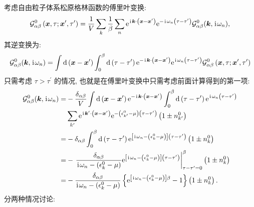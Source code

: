 考虑自由粒子体系松原格林函数的傅里叶变换:
\begin{equation}
\mathcal{G}_{\alpha \beta}^0\left(\boldsymbol{x}, \tau ; \boldsymbol{x}^{\prime}, \tau^{\prime}\right)=\frac{1}{V} \sum_k  \frac{1}{\beta} \sum_n\mathrm{e}^{\hspace{0.1em}\mathrm{i}\hspace{0.1em} \boldsymbol{k} \cdot\left(\boldsymbol{x}-\boldsymbol{x}^{\prime}\right)} \mathrm{e}^{-\hspace{0.1em}\mathrm{i}\hspace{0.1em} \omega_n\left(\tau-\tau^{\prime}\right)} \mathcal{G}_{\alpha \beta}^0(\boldsymbol{k}, \hspace{0.1em}\mathrm{i}\hspace{0.1em} \omega_n),
\end{equation}
其逆变换为:
\begin{equation}
\mathcal{G}_{\alpha \beta}^0(\boldsymbol{k}, \hspace{0.1em}\mathrm{i}\hspace{0.1em} \omega_n)=\int \mathrm{d}\left(\boldsymbol{x}-\boldsymbol{x}^{\prime}\right)\int_0^\beta \mathrm{d}\left(\tau-\tau^{\prime}\right) \mathrm{e}^{-\hspace{0.1em}\mathrm{i}\hspace{0.1em} \boldsymbol{k} \cdot\left(\boldsymbol{x}-\boldsymbol{x}^{\prime}\right)}  \mathrm{e}^{\hspace{0.1em}\mathrm{i}\hspace{0.1em} \omega_n\left(\tau-\tau^{\prime}\right)} \mathcal{G}_{\alpha \beta}^0\left(\boldsymbol{x}, \tau ; \boldsymbol{x}^{\prime}, \tau^{\prime}\right)
\end{equation}
只需考虑 $\tau>\tau^{\prime}$ 的情况, 也就是在傅里叶变换中只需考虑前面计算得到的第一项:
\begin{align}
\mathcal{G}_{\alpha \beta}^0(\boldsymbol{k}, \hspace{0.1em}\mathrm{i}\hspace{0.1em} \omega_n) =&-\frac{\delta_{\alpha \beta}}{V} \int \mathrm{d}\left(\boldsymbol{x}-\boldsymbol{x}^{\prime}\right) \mathrm{e}^{-\hspace{0.1em}\mathrm{i}\hspace{0.1em} \boldsymbol{k} \cdot\left(\boldsymbol{x}-\boldsymbol{x}^{\prime}\right)} \int_0^\beta \mathrm{d}\left(\tau-\tau^{\prime}\right) \mathrm{e}^{\hspace{0.1em}\mathrm{i}\hspace{0.1em} \omega_n\left(\tau-\tau^{\prime}\right)} \nonumber\\
&\sum_{k^{\prime}} \mathrm{e}^{\hspace{0.1em}\mathrm{i}\hspace{0.1em} \boldsymbol{k}^{\prime} \cdot\left(\boldsymbol{x}-\boldsymbol{x}^{\prime}\right)} \mathrm{e}^{-\left(\epsilon_{k^{\prime}}^0-\mu\right)\left(\tau-\tau^{\prime}\right)}\left(1 \pm n_{k^{\prime}}^0\right) \nonumber\\
=&-\delta_{\alpha \beta} \int_0^\beta  \mathrm{d}\left(\tau-\tau^{\prime}\right)\mathrm{e}^{\left[\hspace{0.1em}\mathrm{i}\hspace{0.1em} \omega_n-\left(\epsilon_k^0-\mu\right)\right]\left(\tau-\tau^{\prime}\right)}\left(1 \pm n_k^0\right) \nonumber\\
=&-\left.\frac{\delta_{\alpha \beta}}{\hspace{0.1em}\mathrm{i}\hspace{0.1em} \omega_n-\left(\epsilon_k^0-\mu\right)} \mathrm{e}^{\left[\hspace{0.1em}\mathrm{i}\hspace{0.1em} \omega_n-\left(\epsilon_k^0-\mu\right)\right]\left(\tau-\tau^{\prime}\right)}\right|_{\tau-\tau^{\prime}=0} ^\beta\left(1 \pm n_k^0\right) \nonumber\\
=&-\frac{\delta_{\alpha \beta}}{\hspace{0.1em}\mathrm{i}\hspace{0.1em} \omega_n-\left(\epsilon_k^0-\mu\right)}\left\{\mathrm{e}^{\left[\hspace{0.1em}\mathrm{i}\hspace{0.1em} \omega_n-\left(\epsilon_k^0-\mu\right)\right] \beta}-1\right\}\left(1 \pm n_k^0\right) .
\end{align}
分两种情况讨论:
